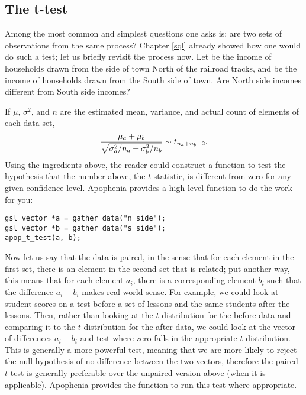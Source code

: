 \subsection{The t-test} \label{ttest} 
Among the most common and simplest questions one asks is: are two 
sets of observations from the same process? Chapter \ref{sql} already showed how one
would do such a test; let us briefly revisit the process now.
Let  be the income of households
drawn from the side of town North of the railroad tracks, and
 be the income of households drawn from the South side of
town. Are North side incomes different from South side incomes? 

If $\mu$,
$\sigma^2$, and $n$ are the estimated mean, variance, and actual count
of elements of each data set,
$${\mu_a + \mu_b \over \sqrt{\sigma^2_a/n_a + \sigma^2_b/n_b}} \sim t_{n_a + n_b -2}.$$
Using the ingredients above, the reader could construct a function to
test the hypothesis that the number above, the $t$-statistic, is
different from zero for any given confidence level. Apophenia provides a
high-level function to do the work for you:

\begin{lstlisting}
gsl_vector *a = gather_data("n_side");
gsl_vector *b = gather_data("s_side");
apop_t_test(a, b);
\end{lstlisting}

Now let us say that the data is paired, in the sense that for each
element in the first set, there is an element in the second set that is
related; put another way, this means that for each element $a_i$, there
is a corresponding element $b_i$ such that the difference $a_i - b_i$
makes real-world sense. For example, we could look at student scores on
a test before a set of lessons and the same students after the lessons.
Then, rather than looking at the $t$-distribution for the before data
and comparing it to the $t$-distribution for the after data, we could
look at the vector of differences $a_i - b_i$ and test where zero falls
in the appropriate $t$-distribution. This is generally a more powerful test,
meaning that we are more likely to reject the null hypothesis of no
difference between the two vectors, therefore the paired $t$-test is
generally preferable over the unpaired version above (when it is
applicable). Apophenia provides the 
function to run this test where appropriate.


